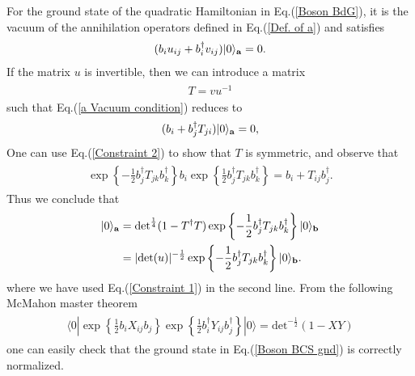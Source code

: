 For the ground state of the quadratic Hamiltonian in Eq.(\ref{Boson BdG}), it is the vacuum of the annihilation operators defined in Eq.(\ref{Def. of a}) and satisfies
\begin{eqnarray}\begin{aligned}
\label{a Vacuum condition}
(b_iu_{ij}+b_i^\dagger v_{ij})|0\rangle_{{\bf a}}=0.
\end{aligned}\end{eqnarray}
If the matrix $u$ is invertible, then we can introduce a matrix
\begin{eqnarray}\begin{aligned}
T=vu^{-1}
\end{aligned}\end{eqnarray}
such that Eq.(\ref{a Vacuum condition}) reduces to
\begin{eqnarray}\begin{aligned}
(b_i+b_j^\dagger T_{ji})|0\rangle_{{\bf a}}=0,
\end{aligned}\end{eqnarray}
One can use Eq.(\ref{Constraint 2}) to show that $T$ is symmetric, and observe that
\begin{eqnarray}\begin{aligned}
\exp\left\{-\frac{1}{2}b_j^\dagger T_{jk}b_k^\dagger\right\}b_i\exp\left\{\frac{1}{2}b_j^\dagger T_{jk}b_k^\dagger\right\}=b_i+T_{ij}b^\dagger_j.
\end{aligned}\end{eqnarray}
Thus we conclude that 
\begin{eqnarray}\begin{aligned}
\label{Boson BCS gnd}
|0\rangle_{{\bf a}}&=\text{det}^{\frac{1}{4}}(1-T^\dagger T)\exp\left\{-\frac{1}{2}b_j^\dagger T_{jk}b_k^\dagger\right\}|0\rangle_{\bf b}\\
&=|\text{det}(u)|^{-\frac{1}{2}}\exp\left\{-\frac{1}{2}b_j^\dagger T_{jk}b_k^\dagger\right\}|0\rangle_{\bf b}.
\end{aligned}\end{eqnarray}
where we have used Eq.(\ref{Constraint 1}) in the second line. From the following McMahon master theorem
\begin{eqnarray}\begin{aligned}\label{Bosonic McMahon}
\langle0|\exp\left\{\frac{1}{2}b_iX_{ij}b_j\right\}\exp\left\{\frac{1}{2}b^\dagger_iY_{ij}b^\dagger_j\right\}|0\rangle=\text{det}^{-\frac{1}{2}}(1-XY)
\end{aligned}\end{eqnarray}
one can easily check that the ground state in Eq.(\ref{Boson BCS gnd}) is correctly normalized. 

